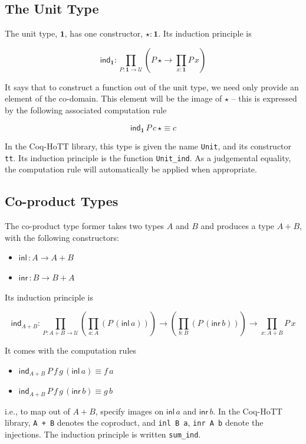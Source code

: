 \documentclass[12 pt]{amsart}
\theoremstyle{definition}
\theoremstyle{remark}
\newcommand{\inl}{\mathsf{inl}\,}
\newcommand{\inr}{\mathsf{inr}\,}
\newcommand{\Type}{\mathcal{U}}
\newcommand{\one}{{\mathbf{1}}}
\newcommand{\ind}{\mathsf{ind}}
\begin{document}
\subsection{The Unit Type}
The unit type, $\one$, has one constructor, $\star : \one$. Its induction principle is

\[\ind_{\one} : \prod_{P : \one \to \Type} \left(P\,  \star \to \prod_{x : \one} P\, x\right)\]

It says that to construct a function out of the unit type, we need only provide an element of the co-domain. This element will be the image of $\star$ -- this is expressed by the following associated computation rule

\[\ind_\one \,P \,c\, \star \equiv c\]

In the Coq-HoTT library, this type is given the name \texttt{Unit}, and its constructor \texttt{tt}. Its induction principle is the function \texttt{Unit\_ind}. As a judgemental equality, the computation rule will automatically be applied when appropriate.

\subsection{Co-product Types}

The co-product type former takes two types $A$ and $B$ and produces a type $A + B$, with the following constructors:
\begin{itemize}
    \item $\inl : A\to A+B$
    \item $\inr : B \to B+A$   
\end{itemize}

Its induction principle is 

\[\ind_{A + B} : \prod_{P : A + B \to \Type} \left(\prod_{a : A} (P\, (\inl a)) \right) \to \left(\prod_{b : B} (P \,(\inr b)) \right) \to \prod_{x : A + B} P\, x\]

It comes with the computation rules

\begin{itemize}
\item $\ind_{A + B} \,P \,f\, g \,(\inl a) \equiv f\,a$
\item $\ind_{A + B} \,P \,f\, g \,(\inr b) \equiv g\,b$
\end{itemize}

i.e., to map out of $A + B$, specify images on $\inl a$ and $\inr b$. In the Coq-HoTT library, \texttt{A + B} denotes the coproduct, and \texttt{inl B a}, \texttt{inr A b} denote the injections. The induction principle is written \texttt{sum\_ind}.
\end{document}
